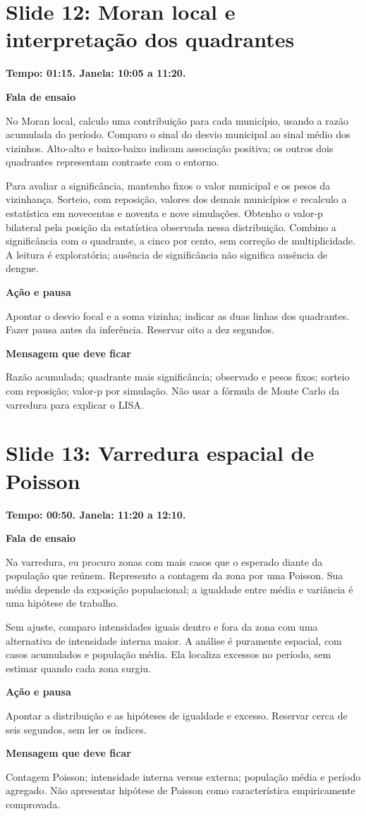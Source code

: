 \documentclass[11pt,a4paper]{article}
\newcommand{\bloco}[1]{\par\Needspace{3\baselineskip}\textbf{#1}\par}
\newcommand{\slide}[2]{\Needspace{13\baselineskip}\section*{Slide #1: #2}}
\begin{document}
\par\begin{minipage}{\textwidth}
\slide{12}{Moran local e interpretação dos quadrantes}
{\color{azul}\textbf{Tempo: 01:15. Janela: 10:05 a 11:20.}}\par
\bloco{Fala de ensaio}
No Moran local, calculo uma contribuição para cada município, usando a razão acumulada do período. Comparo o sinal do desvio municipal ao sinal médio dos vizinhos. Alto-alto e baixo-baixo indicam associação positiva; os outros dois quadrantes representam contraste com o entorno.

Para avaliar a significância, mantenho fixos o valor municipal e os pesos da vizinhança. Sorteio, com reposição, valores dos demais municípios e recalculo a estatística em novecentas e noventa e nove simulações. Obtenho o valor-p bilateral pela posição da estatística observada nessa distribuição. Combino a significância com o quadrante, a cinco por cento, sem correção de multiplicidade. A leitura é exploratória; ausência de significância não significa ausência de dengue.
\bloco{Ação e pausa}
Apontar o desvio focal e a soma vizinha; indicar as duas linhas dos quadrantes. Fazer pausa antes da inferência. Reservar oito a dez segundos.
\bloco{Mensagem que deve ficar}
Razão acumulada; quadrante mais significância; observado e pesos fixos; sorteio com reposição; valor-p por simulação. Não usar a fórmula de Monte Carlo da varredura para explicar o LISA.
\end{minipage}\par\bigskip
\par\begin{minipage}{\textwidth}
\slide{13}{Varredura espacial de Poisson}
{\color{azul}\textbf{Tempo: 00:50. Janela: 11:20 a 12:10.}}\par
\bloco{Fala de ensaio}
Na varredura, eu procuro zonas com mais casos que o esperado diante da população que reúnem. Represento a contagem da zona por uma Poisson. Sua média depende da exposição populacional; a igualdade entre média e variância é uma hipótese de trabalho.

Sem ajuste, comparo intensidades iguais dentro e fora da zona com uma alternativa de intensidade interna maior. A análise é puramente espacial, com casos acumulados e população média. Ela localiza excessos no período, sem estimar quando cada zona surgiu.
\bloco{Ação e pausa}
Apontar a distribuição e as hipóteses de igualdade e excesso. Reservar cerca de seis segundos, sem ler os índices.
\bloco{Mensagem que deve ficar}
Contagem Poisson; intensidade interna versus externa; população média e período agregado. Não apresentar hipótese de Poisson como característica empiricamente comprovada.
\end{minipage}\par\bigskip
\end{document}
